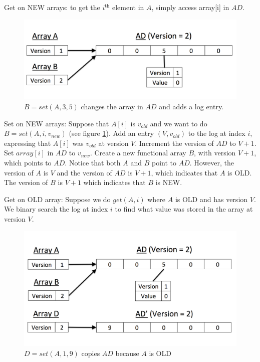 \documentclass[preprint]{sigplanconf}
\begin{document}
Get on NEW arrays: to get the $i^{\text{th}}$ element in $A$, simply access array[i] in $AD$.

\begin{figure}[!ht]
\centering
\includegraphics[scale=0.3]{set_A_return_B}
\nocaptionrule \caption{$B = set(A, 3, 5)$ changes the array in $AD$ and adds a log entry.}
\label{fig:set_A_return_B}
\end{figure}

Set on NEW arrays: Suppose that $A[i]$ is $v_{old}$ and we want to do $B = set(A, i, v_{new})$ (see figure \ref{fig:set_A_return_B}). Add an entry $(V, v_{old})$ to the log at index $i$, expressing that $A[i]$ was $v_{old}$ at version $V$. Increment the version of $AD$ to $V+1$. Set $array[i]$ in $AD$ to $v_{new}$. Create a new functional array $B$, with version $V+1$, which points to $AD$. Notice that both $A$ and $B$ point to $AD$. However, the version of $A$ is $V$ and the version of $AD$ is $V+1$, which indicates that $A$ is OLD. The version of $B$ is $V+1$ which indicates that $B$ is NEW.

Get on OLD array: Suppose we do $get(A, i)$ where $A$ is OLD and has version $V$. We binary search the log at index $i$ to find what value was stored in the array at version $V$.

\begin{figure}[!ht]
\centering
\includegraphics[scale=0.3]{set_old_array}
\nocaptionrule \caption{$D = set(A, 1, 9)$ copies $AD$ because $A$ is OLD}
\label{fig:set_old_array}
\end{figure}
\end{document}
